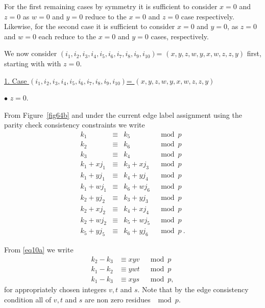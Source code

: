 For the first remaining cases by symmetry it is sufficient to
consider $x=0$ and $z=0$ as $w=0$ and $y=0$ reduce to the $x=0$
and $z=0$ case respectively. Likewise, for the second case it is
sufficient to consider $x=0$ and $y=0$, as $z=0$ and $w=0$ each
reduce to the $x=0$ and $y=0$ cases, respectively.





We now consider $(i_1,i_2,i_3,i_4,i_5,i_6,i_7,i_8,i_9,i_{10})$=
$(x,y,z,w,y,x,w,z,z,y)$ first, starting with with $z=0$. 

\underline{1. Case $(i_1,i_2,i_3,i_4,i_5,i_6,i_7,i_8,i_9,i_{10})$=
$(x,y,z,w,y,x,w,z,z,y)$}

$\bullet$ $z=0$.

 From Figure~\ref{fig64b} and under the current edge label
 assignment using the parity check consistency constraints we write
\begin{equation}\label{eq10a}\begin{array}{ccccc}
k_1 & \equiv &k_5 &\mod p\\
k_2 & \equiv &k_6 &\mod p\\
k_3 & \equiv &k_4 &\mod p\\
k_1+xj_1 & \equiv & k_3+xj_3 &\mod p\\
k_1+yj_1 & \equiv & k_4+yj_4 &\mod p\\
k_1+wj_1 & \equiv & k_6+wj_6 &\mod p\\
k_2+yj_2 & \equiv & k_3+yj_3 &\mod p\\
k_2+xj_2 & \equiv & k_4+xj_4 &\mod p\\
k_2+wj_2 & \equiv & k_5+wj_5 &\mod p\\
k_5+yj_5 & \equiv & k_6+yj_6 &\mod p~.
\end{array}\end{equation}

From \eqref{eq10a} we write
\begin{equation}\label{eq10b}\begin{array}{cccc}
k_2-k_3 &\equiv xyv &\mod p \\
k_1-k_2 &\equiv ywt &\mod p\\
k_1-k_3 &\equiv xys &\mod p,
\end{array}\end{equation}
for appropriately chosen integers $v,t$ and $s$. Note that by the
edge consistency condition all of $v,t$ and $s$ are non zero
residues $\mod p$.


